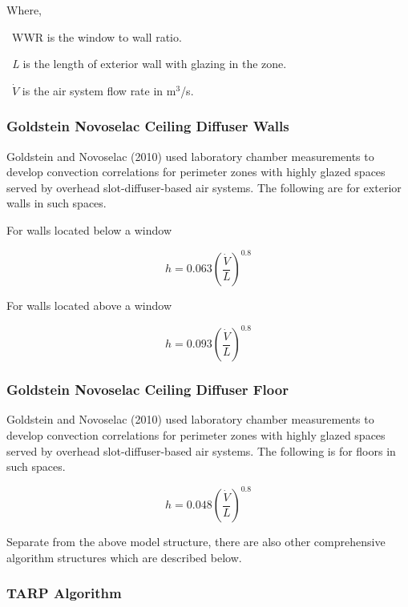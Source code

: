 Where,

~WWR is the window to wall ratio.

~\emph{L} is the length of exterior wall with glazing in the zone.

~\(\dot V\) is the air system flow rate in m\(^{3}\)/s.

\subsubsection{Goldstein Novoselac Ceiling Diffuser Walls}\label{goldstein-novoselac-ceiling-diffuser-walls}

Goldstein and Novoselac (2010) used laboratory chamber measurements to develop convection correlations for perimeter zones with highly glazed spaces served by overhead slot-diffuser-based air systems. The following are for exterior walls in such spaces.

For walls located below a window

\begin{equation}
h = 0.063{\left( {\frac{{\dot V}}{L}} \right)^{0.8}}
\end{equation}

For walls located above a window

\begin{equation}
h = 0.093{\left( {\frac{{\dot V}}{L}} \right)^{0.8}}
\end{equation}

\subsubsection{Goldstein Novoselac Ceiling Diffuser Floor}\label{goldstein-novoselac-ceiling-diffuser-floor}

Goldstein and Novoselac (2010) used laboratory chamber measurements to develop convection correlations for perimeter zones with highly glazed spaces served by overhead slot-diffuser-based air systems. The following is for floors in such spaces.

\begin{equation}
h = 0.048{\left( {\frac{{\dot V}}{L}} \right)^{0.8}}
\end{equation}

Separate from the above model structure, there are also other comprehensive algorithm structures which are described below.

\subsubsection{TARP Algorithm}\label{tarp-algorithm}

